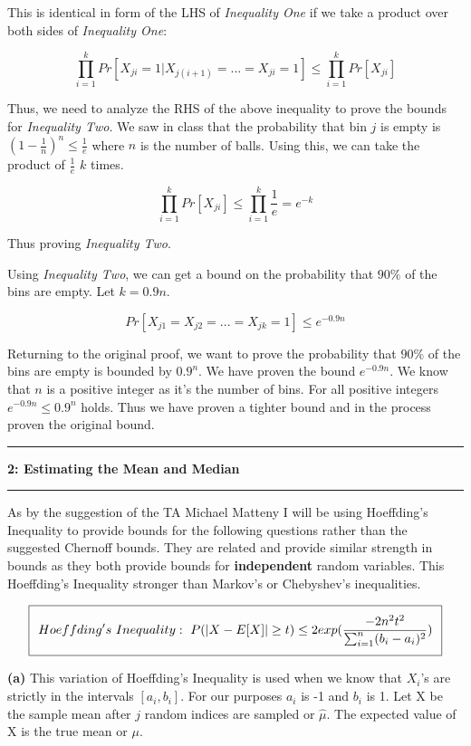 \documentclass[11pt]{article}
\newcommand\question[2]{\vspace{.25in}\hrule\textbf{#1: #2}\vspace{.5em}\hrule\vspace{.10in}}
\renewcommand\part[1]{\vspace{.10in}\textbf{(#1)}}
\begin{document}
This is identical in form of the LHS of \textit{Inequality One} if we take a product over both sides of \textit{Inequality One}:

$$\prod_{i = 1}^k Pr[X_{ji} = 1 | X_{j(i + 1)} = ... = X_{ji} = 1] \leq \prod_{i = 1}^k Pr[X_{ji}]$$

Thus, we need to analyze the RHS of the above inequality to prove the bounds for \textit{Inequality Two}. We saw in class that the probability that bin $j$ is empty is $(1 - \frac{1}{n})^n \leq \frac{1}{e}$ where $n$ is the number of balls. Using this, we can take the product of $\frac{1}{e}$ $k$ times.

$$\prod_{i = 1}^k Pr[X_{ji}] \leq \prod_{i = 1}^k \frac{1}{e} = e^{-k}$$

Thus proving \textit{Inequality Two}.

Using \textit{Inequality Two}, we can get a bound on the probability that $90\%$ of the bins are empty. Let $k = 0.9n$.

$$Pr[X_{j1} = X_{j2} = ... = X_{jk} = 1] \leq e^{-0.9n}$$

Returning to the original proof, we want to prove the probability that $90\%$ of the bins are empty is bounded by $0.9^n$. We have proven the bound $e^{-0.9n}$. We know that $n$ is a positive integer as it's the number of bins. For all positive integers $e^{-0.9n } \leq 0.9^n$ holds. Thus we have proven a tighter bound and in the process proven the original bound.

\question{2}{Estimating the Mean and Median}

As by the suggestion of the TA Michael Matteny I will be using Hoeffding's Inequality to provide bounds for the following questions rather than the suggested Chernoff bounds. They are related and provide similar strength in bounds as they both provide bounds for \textbf{independent} random variables. This Hoeffding's Inequality stronger than Markov's or Chebyshev's inequalities.

\begin{equation}
\setlength\fboxsep{0.25cm}
\setlength\fboxrule{0.4pt}
\boxed{Hoeffding's \ Inequality: \ P(|X - E[X]| \geq t) \leq 2 exp(\frac{-2n^2t^2}{\sum_{i = 1}^n (b_i - a_i)^2})}
\end{equation}

\part{a} This variation of Hoeffding's Inequality is used when we know that $X_i$'s are strictly in the intervals $[a_i, b_i]$. For our purposes $a_i$ is -1 and $b_i$ is 1. Let X be the sample mean after $j$ random indices are sampled or $\hat\mu$. The expected value of X is the true mean or $\mu$. 
\end{document}
